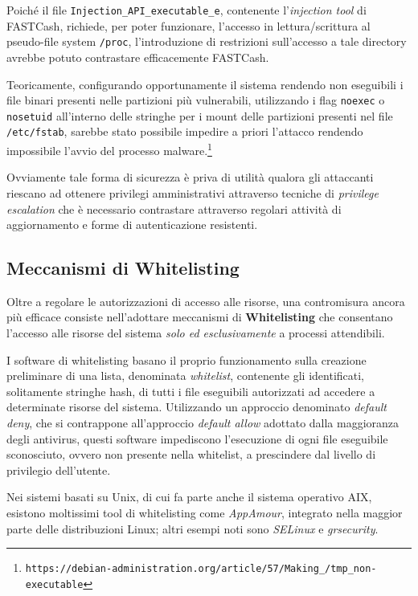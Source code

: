 \documentclass[10pt,a4paper, titlepage]{report}
\begin{document}
Poiché il file \texttt{Injection\_API\_executable\_e}, contenente l'\textit{injection tool} di FASTCash, richiede, per poter funzionare, l'accesso in lettura/scrittura al pseudo-file system \texttt{/proc}, l'introduzione di restrizioni sull'accesso a tale directory avrebbe potuto contrastare efficacemente FASTCash.

Teoricamente, configurando opportunamente il sistema rendendo non eseguibili i file binari presenti nelle partizioni più vulnerabili, utilizzando i flag \texttt{noexec} o \texttt{nosetuid} all'interno delle stringhe per i mount delle partizioni presenti nel file \texttt{/etc/fstab}, sarebbe stato possibile impedire a priori l'attacco rendendo impossibile l'avvio del processo malware.\footnote{\texttt{https://debian-administration.org/article/57/Making\_/tmp\_non-executable}}

Ovviamente tale forma di sicurezza è priva di utilità qualora gli attaccanti riescano ad ottenere privilegi amministrativi attraverso tecniche di \textit{privilege escalation} che è necessario contrastare attraverso regolari attività di aggiornamento e forme di autenticazione resistenti.

\subsection{Meccanismi di Whitelisting}

Oltre a regolare le autorizzazioni di accesso alle risorse, una contromisura ancora più efficace consiste nell'adottare meccanismi di \textbf{Whitelisting} che consentano l'accesso alle risorse del sistema \textit{solo ed esclusivamente} a processi attendibili. 

I software di whitelisting basano il proprio funzionamento sulla creazione preliminare di una lista, denominata \textit{whitelist}, contenente gli identificati, solitamente stringhe hash, di tutti i file eseguibili autorizzati ad accedere a determinate risorse del sistema. Utilizzando un approccio denominato \textit{default deny}, che si contrappone all'approccio \textit{default allow} adottato dalla maggioranza degli antivirus, questi software impediscono l'esecuzione di ogni file eseguibile sconosciuto, ovvero non presente nella whitelist, a prescindere dal livello di privilegio dell'utente.

Nei sistemi basati su Unix, di cui fa parte anche il sistema operativo AIX, esistono moltissimi tool di whitelisting come \textit{AppAmour}, integrato nella maggior parte delle distribuzioni Linux; altri esempi noti sono \textit{SELinux} e \textit{grsecurity}.
\end{document}
